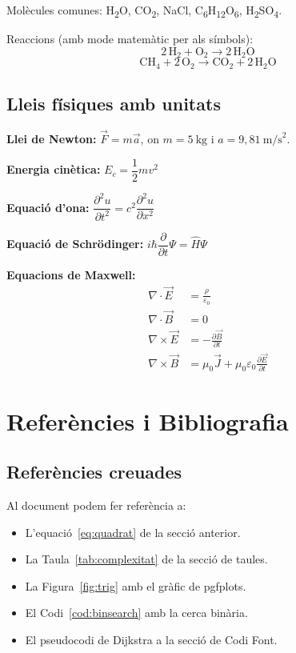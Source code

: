 \documentclass[informe, catalan]{practicaitic}
\theoremstyle{definition}
\theoremstyle{remark}
\begin{document}
Molècules comunes:
H\textsubscript{2}O, \quad CO\textsubscript{2}, \quad NaCl, \quad
C\textsubscript{6}H\textsubscript{12}O\textsubscript{6}, \quad H\textsubscript{2}SO\textsubscript{4}.

Reaccions (amb mode matemàtic per als símbols):
\[
2\,\mathrm{H_2} + \mathrm{O_2} \longrightarrow 2\,\mathrm{H_2O}
\]
\[
\mathrm{CH_4} + 2\,\mathrm{O_2} \longrightarrow \mathrm{CO_2} + 2\,\mathrm{H_2O}
\]

\subsection{Lleis físiques amb unitats}

\textbf{Llei de Newton:} $\vec{F} = m\vec{a}$, on $m = 5\ \text{kg}$ i $a = 9{,}81\ \text{m/s}^2$.

\textbf{Energia cinètica:} $E_c = \dfrac{1}{2}mv^2$

\textbf{Equació d'ona:} $\dfrac{\partial^2 u}{\partial t^2} = c^2 \dfrac{\partial^2 u}{\partial x^2}$

\textbf{Equació de Schrödinger:} $i\hbar\dfrac{\partial}{\partial t}\Psi = \hat{H}\Psi$

\textbf{Equacions de Maxwell:}
\begin{align}
  \nabla \cdot \vec{E} &= \frac{\rho}{\varepsilon_0} \\
  \nabla \cdot \vec{B} &= 0 \\
  \nabla \times \vec{E} &= -\frac{\partial \vec{B}}{\partial t} \\
  \nabla \times \vec{B} &= \mu_0\vec{J} + \mu_0\varepsilon_0\frac{\partial \vec{E}}{\partial t}
\end{align}


\section{Referències i Bibliografia}

\subsection{Referències creuades}

Al document podem fer referència a:
\begin{itemize}
  \item L'equació~\eqref{eq:quadrat} de la secció anterior.
  \item La Taula~\ref{tab:complexitat} de la secció de taules.
  \item La Figura~\ref{fig:trig} amb el gràfic de pgfplots.
  \item El Codi~\ref{cod:binsearch} amb la cerca binària.
  \item El pseudocodi de Dijkstra a la secció de Codi Font.
\end{itemize}
\end{document}
